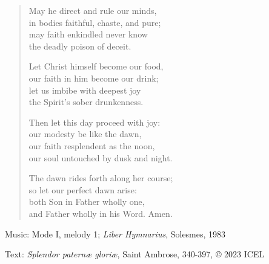 \hymn



\setlength{\leftmargini}{2em}
\begin{verse}
May he direct and rule our minds,\\
in bodies faithful, chaste, and pure;\\
may faith enkindled never know\\
the deadly poison of deceit.

Let Christ himself become our food,\\
our faith in him become our drink;\\
let us imbibe with deepest joy\\
the Spirit’s sober drunkenness.

Then let this day proceed with joy:\\
our modesty be like the dawn,\\
our faith resplendent as the noon,\\
our soul untouched by dusk and night.

The dawn rides forth along her course;\\
so let our perfect dawn arise:\\
both Son in Father wholly one,\\
and Father wholly in his Word. Amen.
\end{verse}
\setlength{\leftmargini}{\defleftmargini}


\begin{hymnsource}
Music: Mode I, melody 1; \emph{Liber Hymnarius}, Solesmes, 1983

Text: \emph{Splendor paternæ gloriæ}, Saint Ambrose, 340-397, © 2023 ICEL
\end{hymnsource}
